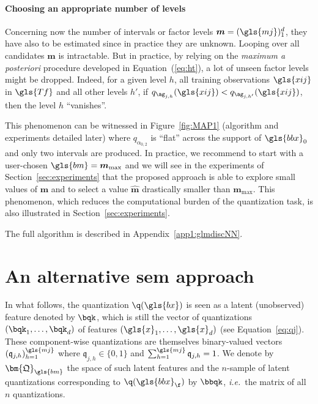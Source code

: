  
\paragraph{Choosing an appropriate number of levels}

Concerning now the number of intervals or factor levels $\boldsymbol{m} = (\gls{mj})_1^d$, they have also to be estimated since in practice they are unknown. Looping over all candidates $\boldsymbol{m}$ is intractable. But in practice, by relying on the \textit{maximum a posteriori} procedure developed in Equation~(\ref{eq:ht}), a lot of unseen factor levels might be dropped. Indeed, for a given level $h$, all training observations $\gls{xij}$ in $\gls{Tf}$ and all other levels $h'$, if $q_{\ag_{j,h}}(\gls{xij}) < q_{\ag_{j,h'}}(\gls{xij})$, then the level $h$ ``vanishes''.

This phenomenon can be witnessed in Figure~\ref{fig:MAP1} (algorithm and experiments detailed later) where $q_{\alpha_{0,2}}$ is ``flat'' across the support of $\gls{bbx}_0$ and only two intervals are produced. In practice, we recommend to start with a user-chosen $\gls{bm}=\boldsymbol{m}_{\max}$ and we will see in the experiments of Section~\ref{sec:experiments} that the proposed approach is able to explore small values of $\boldsymbol{m}$ and to select a value $\hat{\boldsymbol{m}}$ drastically smaller than $\boldsymbol{m}_{\max}$. This phenomenon, which reduces the computational burden of the quantization task, is also illustrated in Section~\ref{sec:experiments}.

The full algorithm is described in Appendix~\ref{app1:glmdiscNN}.


\section{An alternative \gls{sem} approach} \label{sec:sem}
 
In what follows, the quantization $\q(\gls{bx})$ is seen as a latent (unobserved) feature denoted by $\bqk$, which is still the vector of quantizations $(\bqk_1, \dots, \bqk_d)$ of features $(\gls{x}_1, \dots, \gls{x}_d)$ (see Equation~\eqref{eq:qj}). These component-wise quantizations are themselves binary-valued vectors $(\mathfrak{q}_{j,h})_{h=1}^{\gls{mj}}$ where $\mathfrak{q}_{j,h} \in \{0,1\}$ and $\sum_{h=1}^{\gls{mj}} \mathfrak{q}_{j,h} = 1$. We denote by $\bm{\mathfrak{Q}}_{\gls{bm}}$ the space of such latent features and the $n$-sample of latent quantizations corresponding to $\q(\gls{bbx}_\f)$ by $\bbqk$, \textit{i.e.}\ the matrix of all $n$ quantizations.

